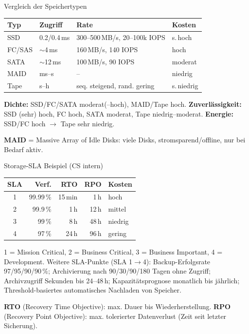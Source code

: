 \documentclass[a4paper, fontsize=7pt]{scrartcl}
\renewcommand*{\arraystretch}{1.5}  %
\begin{document}
\begin{subbox}{Vergleich der Speichertypen}
\renewcommand*{\arraystretch}{1.15}
\setlength{\tabcolsep}{3pt}
\begin{tabularx}{\linewidth}{@{}l|l|X|l@{}}
\textbf{Typ} & \textbf{Zugriff} & \textbf{Rate} & \textbf{Kosten} \\
\hline
SSD & 0.2/0.4\,ms & 300--500\,MB/s, 20--100k IOPS & s.\,hoch \\
FC/SAS & $\sim$4\,ms & 160\,MB/s, 140 IOPS & hoch \\
SATA & $\sim$12\,ms & 100\,MB/s, 90 IOPS & moderat \\
MAID & ms--s & -- & niedrig \\
Tape & s--h & seq. steigend, rand. gering & s.\,niedrig \\
\end{tabularx}
\textbf{Dichte:} SSD/FC/SATA moderat(--hoch), MAID/Tape hoch.
\textbf{Zuverlässigkeit:} SSD (sehr) hoch, FC hoch, SATA moderat, Tape
niedrig--moderat. \textbf{Energie:} SSD/FC hoch $\to$ Tape sehr niedrig.

\textbf{MAID} = Massive Array of Idle Disks: viele Disks, stromsparend/offline,
nur bei Bedarf aktiv.
\end{subbox}

\begin{subbox}{Storage-SLA Beispiel (CS intern)}
\renewcommand*{\arraystretch}{1.15}
\setlength{\tabcolsep}{3pt}
\begin{center}
\begin{tabular}{c|r|r|r|l}
\textbf{SLA} & \textbf{Verf.} & \textbf{RTO} & \textbf{RPO} & \textbf{Kosten} \\
\hline
1 & 99.99\,\% & 15\,min & 1\,h & hoch \\
2 & 99.9\,\% & 1\,h & 12\,h & mittel \\
3 & 99\,\% & 8\,h & 48\,h & niedrig \\
4 & 97\,\% & 24\,h & 96\,h & gering \\
\end{tabular}
\end{center}
1 = Mission Critical, 2 = Business Critical, 3 = Business Important,
4 = Development.
Weitere SLA-Punkte (SLA 1$\to$4): Backup-Erfolgsrate 97/95/90/90\,\%;
Archivierung nach 90/30/90/180 Tagen ohne Zugriff; Archivzugriff Sekunden
bis 24--48\,h; Kapazitätsprognose monatlich bis jährlich; Threshold-basiertes
automatisches Nachladen von Speicher.

\textbf{RTO} (Recovery Time Objective): max. Dauer bis Wiederherstellung.
\textbf{RPO} (Recovery Point Objective): max. tolerierter Datenverlust (Zeit
seit letzter Sicherung).
\end{subbox}
\end{document}
